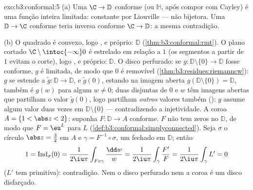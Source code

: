 \begin{solution}{exo:b3:conformal:5}
(a) Uma $\C \to \mathbb D$ conforme (ou $\mathbb H$, após
compor com Cayley) é uma função inteira limitada:
constante por Liouville --- não bijetora. Uma $\mathbb
D \to \C$ conforme teria inversa conforme $\C \to \mathbb D$:
a mesma contradição.

(b) O quadrado é convexo, logo , e próprio:
 $\mathbb D$ (\cref{thm:b3:conformal:rmt}). O plano
cortado $\C\setminus\intoc{-\infty}0$ é estrelado em relação a $1$
(os segmentos a partir de $1$ evitam o corte), logo ,
e próprio:  $\mathbb D$. O disco perfurado: se
$g \colon \mathbb D\setminus\{0\} \to \mathbb D$ fosse
conforme, $g$ é limitada, de modo que $0$ é removível
(\cref{thm:b3:residues:riemanncw}): $g$ se estende a $\tilde g
\colon \mathbb D \to \mathbb D$, e $\tilde g(0)$, estando
na imagem aberta $g(\mathbb D\setminus\{0\}) = \mathbb D$, também
é $g(w)$ para algum $w \neq 0$; duas  disjuntas
de $0$ e $w$ têm imagens abertas que partilham o valor
$\tilde g(0)$, logo partilham \emph{outros} valores também (): $g$ assume algum valor duas vezes em
$\mathbb D\setminus\{0\}$ --- contradizendo a injetividade. A
coroa $A = \{1 < \abs z < 2\}$: suponha $F \colon \mathbb D
\to A$ conforme. $F$ não tem zeros no 
$\mathbb D$, de modo que $F = \eu^L$ para $L$ 
(\cref{def:b3:conformal:simplyconnected}). Seja $\sigma$
o círculo $\abs z = \frac32$ em $A$ e $\gamma =
F^{-1}\circ\sigma$, um  fechado em $\mathbb D$; então
\[
1 = \operatorname{Ind}_\sigma(0)
= \frac1{2\iu\pi}\int_{F\circ\gamma}\frac{\dd w}{w}
= \frac1{2\iu\pi}\int_\gamma\frac{F'}{F}
= \frac1{2\iu\pi}\int_\gamma L' = 0
\]
($L'$ tem primitiva): contradição. Nem o disco perfurado
nem a coroa é um disco disfarçado.
\end{solution}

